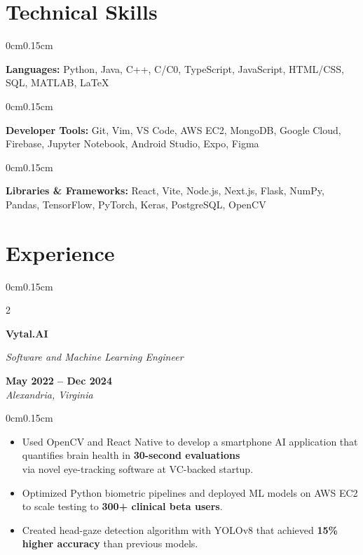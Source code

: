 \documentclass[10pt, letterpaper]{article}
\newenvironment{highlights}{
    \begin{itemize}[topsep=0pt, parsep=0pt, partopsep=0pt, itemsep=0pt, leftmargin=0.6cm]
}{
    \end{itemize}
}
\newenvironment{onecolentry}{
    \begin{adjustwidth}{0cm}{0.15cm}
}{
    \end{adjustwidth}
}
\newenvironment{twocolentry}[2][]{
    \onecolentry
    \def\secondColumn{#2}
    \setcolumnwidth{\fill, 4cm}
    \begin{paracol}{2}
}{
    \switchcolumn \raggedleft \secondColumn
    \end{paracol}
    \endonecolentry
}
\begin{document}
    \vspace{0.05cm}

    \section{Technical Skills}
    \vspace{0.1cm}

    \begin{onecolentry}
        \textbf{Languages:} Python, Java, C++, C/C0, TypeScript, JavaScript, HTML/CSS, SQL, MATLAB, LaTeX
    \end{onecolentry}
    \vspace{-0.1cm}
    \begin{onecolentry}
        \textbf{Developer Tools:} Git, Vim, VS Code, AWS EC2, MongoDB, Google Cloud, Firebase, Jupyter Notebook, Android Studio, Expo, Figma
    \end{onecolentry}
    \vspace{-0.1cm}
    \begin{onecolentry}
        \textbf{Libraries \& Frameworks:} React, Vite, Node.js, Next.js, Flask, NumPy, Pandas, TensorFlow, PyTorch, Keras, PostgreSQL, OpenCV
    \end{onecolentry}

    \vspace{0.05cm}

    \section{Experience}
    \vspace{0.1cm}

    \begin{twocolentry}{\textbf{May 2022 -- Dec 2024} \\ \textit{Alexandria, Virginia}}
        \textbf{Vytal.AI}
        
        \textit{Software and Machine Learning Engineer}
    \end{twocolentry}
    \vspace{-0.1cm}
    \begin{onecolentry}
        \begin{highlights}
            \item Used OpenCV and React Native to develop a smartphone AI application that quantifies brain health in \textbf{30-second evaluations} \\ via novel eye-tracking software at VC-backed startup.
            \item Optimized Python biometric pipelines and deployed ML models on AWS EC2 to scale testing to \textbf{300+ clinical beta users}.
            \item Created head-gaze detection algorithm with YOLOv8 that achieved \textbf{15\% higher accuracy} than previous models.
        \end{highlights}
    \end{onecolentry}
\end{document}
